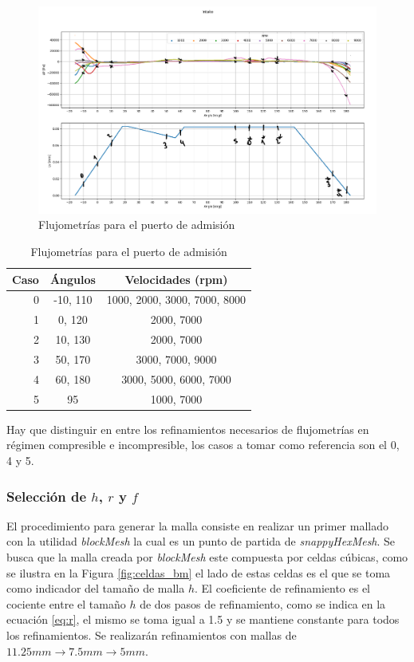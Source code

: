 \documentclass[11pt]{article}
\begin{document}

\begin{figure}
    \centering
    \includegraphics[width=1\textwidth]{flujometrias_admision.png}
    \caption{Flujometrías para el puerto de admisión}
    \label{fig:flujometrias}
\end{figure}

\begin{table}
    \centering
    \begin{tabular}{rcc} \toprule
        Caso & Ángulos & Velocidades (rpm) \\ \midrule
        0 & -10, 110 & 1000, 2000, 3000, 7000, 8000\\
        1 & 0, 120 & 2000, 7000\\
        2 & 10, 130 & 2000, 7000\\
        3 & 50, 170 & 3000, 7000, 9000\\
        4 & 60, 180 & 3000, 5000, 6000, 7000\\
        5 & 95 & 1000, 7000\\ \bottomrule
    \end{tabular}
    \caption{Flujometrías para el puerto de admisión}
    \label{tab:casos}
\end{table}

Hay que distinguir en entre los refinamientos necesarios de flujometrías en
régimen compresible e incompresible, los casos a tomar como referencia son el
0, 4 y 5.

\subsubsection{Selección de $h$, $r$ y $f$}
%
El procedimiento para generar la malla consiste en realizar un primer mallado
con la utilidad \emph{blockMesh} la cual es un punto de partida de
\emph{snappyHexMesh}.
%
Se busca que la malla creada por \emph{blockMesh} este compuesta por celdas
cúbicas, como se ilustra en la Figura \ref{fig:celdas_bm} el lado de estas
celdas es el que se toma como indicador del tamaño de malla $h$.
%
El coeficiente de refinamiento es el cociente entre el tamaño $h$ de dos pasos
de refinamiento, como se indica en la ecuación \ref{eq:r}, el mismo se toma
igual a 1.5 y se mantiene constante para todos los refinamientos.
%
Se realizarán refinamientos con mallas de $11.25mm \rightarrow 7.5mm
\rightarrow 5mm$.
\end{document}
